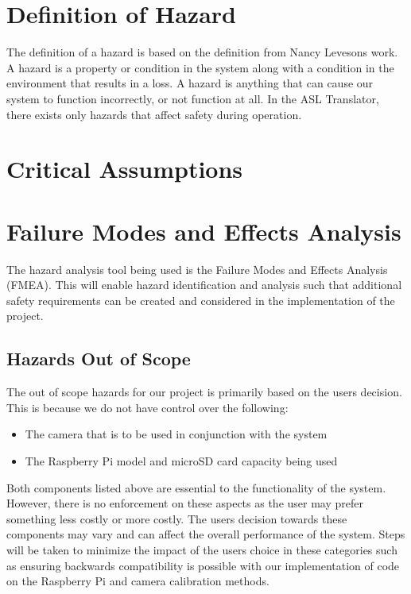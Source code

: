\documentclass{article}
\begin{document}
\section{Definition of Hazard}

The definition of a hazard is based on the definition from Nancy Leveson\textquotesingle s work. A hazard is a property or condition in the system along with a condition in the
environment that results in a loss. A hazard is anything that can cause our system to function incorrectly, or not function at all. In the ASL Translator, there
exists only hazards that affect safety during operation.\\


\section{Critical Assumptions}

\section{Failure Modes and Effects Analysis}

The hazard analysis tool being used is the Failure Modes and Effects Analysis (FMEA). This will enable hazard identification and analysis such that additional safety requirements can 
be created and considered in the implementation of the project.\\

\subsection{Hazards Out of Scope}

The out of scope hazards for our project is primarily based on the user\textquotesingle s decision. This is because we do not have control over the following:\\
\begin{itemize}
    \item The camera that is to be used in conjunction with the system
    \item The Raspberry Pi model and microSD card capacity being used
\end{itemize}

Both components listed above are essential to the functionality of the system. However, there is no enforcement on these aspects as the user may prefer something 
less costly or more costly. The user\textquotesingle s decision towards these components may vary and can affect the overall performance of the system. Steps will be taken to minimize 
the impact of the user\textquotesingle s choice in these categories such as ensuring backwards compatibility is possible with our implementation of code on the Raspberry Pi and camera 
calibration methods.\\
\end{document}

